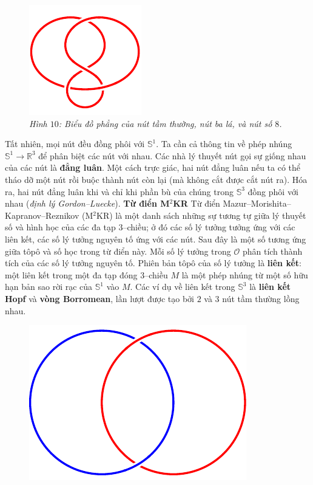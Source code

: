 \begin{multicols}{2}
\begin{figure}[H]
		\includegraphics[width= 0.28\linewidth]{figure 8.pdf}
		\caption{\small\textit{\color{duongvaotoanhoc}Hình $10$: Biểu đồ phẳng của nút tầm thường, nút ba lá, và nút số $8$.}}
		\vspace*{-10pt}
	\end{figure}
	Tất nhiên, mọi nút đều đồng phôi với $\mathbb{S}^1$. Ta cần cả thông tin về phép nhúng $\mathbb{S}^1 \to \mathbb{R}^3$ để phân biệt các nút với nhau. Các nhà lý thuyết nút gọi sự giống nhau của các nút là {\bf\color{duongvaotoanhoc} đẳng luân}. Một cách trực giác, hai nút đẳng luân nếu ta có thể tháo dỡ một nút rồi buộc thành nút còn lại (mà không cắt được cắt nút ra). Hóa ra, hai nút đẳng luân khi và chỉ khi phần bù của chúng trong $\mathbb{S}^3$ đồng phôi với nhau ({\it định lý Gordon--Luecke}).
	\vskip 0.1cm
	\textbf{\color{duongvaotoanhoc}Từ điển M$^2$KR}
	\vskip 0.1cm
	Từ điển Mazur--Morishita--Kapranov--Reznikov (M$^2$KR) là một danh sách những sự tương tự giữa lý thuyết số và hình học của các đa tạp $3$--chiều; ở đó các số lý tưởng tưởng ứng với các liên kết, các số lý tưởng nguyên tố ứng với các nút. Sau đây là một số tương ứng giữa tôpô và số học trong từ điển này.
	\vskip 0.1cm
	Mỗi số lý tưởng trong $\mathcal{O}$ phân tích thành tích của các số lý tưởng nguyên tố. Phiên bản tôpô của số lý tưởng là {\bf\color{duongvaotoanhoc} liên kết}: một liên kết trong một đa tạp đóng $3$--chiều $M$ là một phép nhúng từ một số hữu hạn bản sao rời rạc của $\mathbb{S}^1$ vào $M$. Các ví dụ về liên kết trong $\mathbb{S}^3$ là {\bf\color{duongvaotoanhoc} liên kết Hopf} và {\bf\color{duongvaotoanhoc} vòng Borromean}, lần lượt được tạo bởi $2$ và $3$ nút tầm thường lồng nhau.
	\begin{figure}[H]
		\vspace*{-15pt}
		\centering
		\captionsetup{labelformat= empty, justification=centering}
		\includegraphics[width= 0.38\linewidth]{hopf.pdf}\quad\quad

\end{figure}
\end{multicols}

